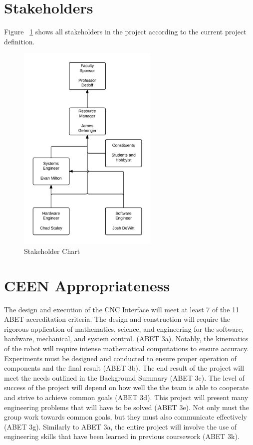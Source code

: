 \section{Stakeholders}
Figure ~\ref{fig:stakeholders} shows all stakeholders in the project according to the current project definition. 

\begin{figure}[H]
\centering
\includegraphics[width=0.6\textwidth]{shc.jpeg}
\caption{Stakeholder Chart}
\label{fig:stakeholders}
\end{figure}

\section{CEEN Appropriateness}
The design and execution of the CNC Interface will meet at least 7 of the 11 ABET accreditation criteria.
The design and construction will require the rigorous application of mathematics, science, and engineering for the software, hardware, mechanical, and system control. (ABET 3a).
Notably, the kinematics of the robot will require intense mathematical computations to ensure accuracy.
Experiments must be designed and conducted to ensure proper operation of components and the final result (ABET 3b).
The end result of the project will meet the needs outlined in the Background Summary (ABET 3c).
The level of success of the project will depend on how well the the team is able to cooperate and strive to achieve common goals (ABET 3d).
This project will present many engineering problems that will have to be solved (ABET 3e).
Not only must the group work towards common goals, but they must also communicate effectively (ABET 3g).
Similarly to ABET 3a, the entire project will involve the use of engineering skills that have been learned in previous coursework (ABET 3k).

